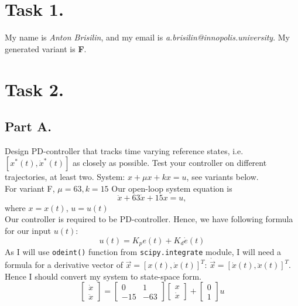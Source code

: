 \documentclass[a4paper,12pt]{article}
\begin{document}
\section{Task 1.}
My name is \textit{Anton Brisilin}, and my email is 
\textit{a.brisilin@innopolis.university}. 
My generated variant is \textbf{F}.
\section{Task 2.}
    \subsection*{Part A.}
        Design PD-controller that tracks time varying reference states, i.e.
        \\ $[x^*(t), \dot{x}^*(t)]$ as closely as possible. Test your controller on different
        trajectories, at least two. System: $x + \mu x + kx = u$, see variants below.\\
        For variant F, $\mu = 63, k = 15$
        Our open-loop system equation is 
        \begin{equation*}
            \ddot{x}+63\dot{x}+15x=u,
        \end{equation*}
        where $x=x(t)$, $u=u(t)$\\
        Our controller is required to be PD-controller. Hence, we have following formula
        for our input $u(t)$:
        \begin{equation*}
            u(t) = K_p e(t) + K_d\dot{e}(t)
        \end{equation*}
        As I will use \texttt{odeint()} function from \texttt{scipy.integrate} module,
        I will need a formula for a derivative vector of $\vec{x} = [x(t),\dot{x}(t)]^T$: 
        $\dot{\vec{x}} = [\dot{x}(t),\ddot{x}(t)]^T$. Hence I should convert my system to 
        state-space form.
        \begin{equation*}
            \begin{bmatrix}
                \dot{x}\\
                \ddot{x}
            \end{bmatrix}
            = 
            \begin{bmatrix}
                0 & 1 \\
                -15 & -63
            \end{bmatrix}
            \begin{bmatrix}
                x\\
                \dot{x}
            \end{bmatrix}
            +
            \begin{bmatrix}
                0 \\
                1
            \end{bmatrix}
            u
        \end{equation*}
\end{document}
